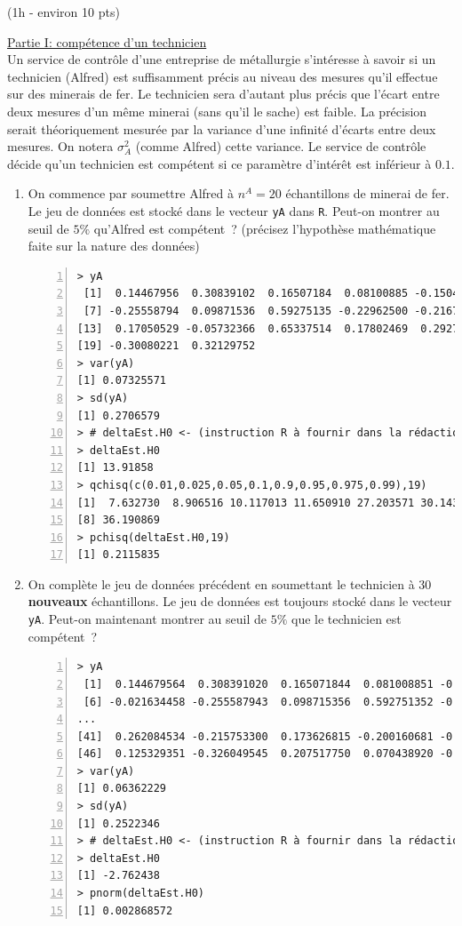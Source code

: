 \documentclass[10pt]{report}
\begin{document}
\begin{exercice} (1h - environ 10 pts)

\noindent \underline{Partie I: compétence d'un technicien} \\

Un service de contr{\^o}le d'une entreprise de m{\'e}tallurgie s'int{\'e}resse {\`a} savoir si un technicien (Alfred) est suffisamment pr{\'e}cis au niveau des mesures qu'il effectue sur des minerais de fer. Le technicien sera d'autant plus précis que l'écart entre deux mesures d'un même minerai (sans qu'il le sache) est faible. La précision serait théoriquement mesurée  par la variance d'une infinité d'écarts entre deux mesures. On notera $\sigma^2_A$ (comme Alfred) cette variance.  Le service de contr{\^o}le d{\'e}cide qu'un technicien est comp{\'e}tent si ce param{\`e}tre d'int{\'e}r{\^e}t est inf{\'e}rieur {\`a} $0.1$. \\ 

\begin{enumerate}
\item On commence par soumettre Alfred à $n^A=20$ échantillons de minerai de fer. Le jeu de données est stocké dans le vecteur \texttt{yA} dans \texttt{R}. Peut-on montrer au seuil de $5\%$ qu'Alfred est compétent~? (précisez l'hypothèse mathématique faite sur la nature des données)

\IndicR
\begin{Verbatim}[frame=leftline,fontfamily=tt,fontshape=n,numbers=left]
> yA
 [1]  0.14467956  0.30839102  0.16507184  0.08100885 -0.15048984 -0.02163446
 [7] -0.25558794  0.09871536  0.59275135 -0.22962500 -0.21676732 -0.09707208
[13]  0.17050529 -0.05732366  0.65337514  0.17802469  0.29278735 -0.16514972
[19] -0.30080221  0.32129752
> var(yA)
[1] 0.07325571
> sd(yA)
[1] 0.2706579
> # deltaEst.H0 <- (instruction R à fournir dans la rédaction)
> deltaEst.H0
[1] 13.91858
> qchisq(c(0.01,0.025,0.05,0.1,0.9,0.95,0.975,0.99),19)
[1]  7.632730  8.906516 10.117013 11.650910 27.203571 30.143527 32.852327
[8] 36.190869
> pchisq(deltaEst.H0,19)
[1] 0.2115835
\end{Verbatim}




\item On complète le jeu de données précédent en soumettant le technicien à 30 \textbf{nouveaux} échantillons. Le jeu de données est toujours stocké dans le vecteur \texttt{yA}. Peut-on maintenant montrer au seuil de $5\%$ que le technicien est compétent~?

\IndicR
\begin{Verbatim}[frame=leftline,fontfamily=tt,fontshape=n,numbers=left]
> yA
 [1]  0.144679564  0.308391020  0.165071844  0.081008851 -0.150489836
 [6] -0.021634458 -0.255587943  0.098715356  0.592751352 -0.229624997
...
[41]  0.262084534 -0.215753300  0.173626815 -0.200160681 -0.255138748
[46]  0.125329351 -0.326049545  0.207517750  0.070438920 -0.303221493
> var(yA)
[1] 0.06362229
> sd(yA)
[1] 0.2522346
> # deltaEst.H0 <- (instruction R à fournir dans la rédaction)
> deltaEst.H0
[1] -2.762438
> pnorm(deltaEst.H0)
[1] 0.002868572
\end{Verbatim}




\end{enumerate}
\end{exercice}
\end{document}
